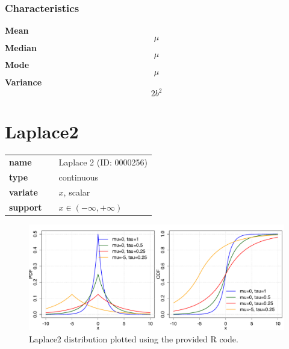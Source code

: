 \subsubsection*{Characteristics}
\smallskip \noindent \hspace{.2cm} \textbf{Mean} 
\begin{equation*}\mu\end{equation*}
\smallskip \noindent \hspace{.2cm} \textbf{Median} 
\begin{equation*}\mu\end{equation*}
\smallskip \noindent \hspace{.2cm} \textbf{Mode} 
\begin{equation*}\mu\end{equation*}
\smallskip \noindent \hspace{.2cm} \textbf{Variance} 
\begin{equation*}2 b^2\end{equation*}
\smallskip
\section*{Laplace2} 

  \bigskip 

\begin{tabular}{p{2cm}cl}
\textbf{name} & & Laplace 2 (ID: 0000256)\\ 
 
\textbf{type} & & continuous \\ 

\textbf{variate} & & $x$, scalar \\ 

\textbf{support} & & $x \in (-\infty,+\infty)$
\end{tabular}

\begin{figure}[ht!]
\centering
  \includegraphics[width=140mm]{pics/Laplace2.pdf}
 \caption{Laplace2 distribution plotted using the provided R code.}
 \label{fig:Laplace2}
\end{figure}

